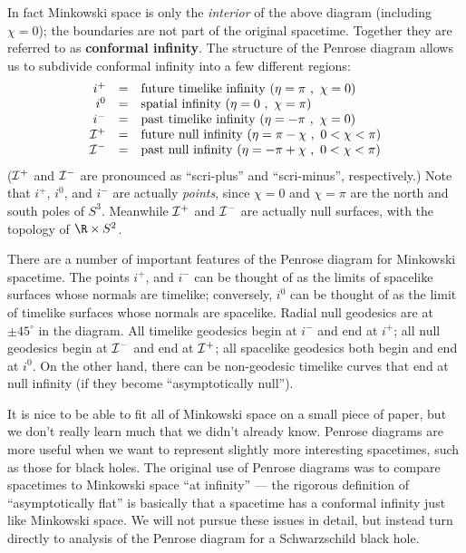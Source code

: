 In fact Minkowski space is only the {\it interior} of the above
diagram (including $\chi=0$); the boundaries are not part of the
original spacetime.  Together they are referred to as {\bf conformal
infinity}.  The structure of the Penrose diagram allows us to subdivide 
conformal infinity into
a few different regions:
\[
  \begin{array}{rcl}
  i^+ &=&  {\rm future~timelike~infinity~} (\eta=\pi\ ,\ \chi=0)\cr
  i^0 &=&  {\rm spatial~infinity~} (\eta=0\ ,\ \chi=\pi)\cr
  i^- &=&  {\rm past~timelike~infinity~} (\eta=-\pi\ ,\ \chi=0)\cr
  {\cal I}^+ &=& {\rm future~null~infinity~} (\eta=\pi-\chi\ ,\ 0<\chi<\pi)\cr
  {\cal I}^- &=& {\rm past~null~infinity~} (\eta=-\pi+\chi\ ,\ 0<\chi<\pi)
  \end{array}
\]
(${\cal I}^+$ and ${\cal I}^-$ are pronounced as ``scri-plus'' and
``scri-minus'', respectively.)  Note that $i^+$, $i^0$, and $i^-$ are
actually {\it points}, since $\chi=0$ and $\chi=\pi$ are the north and
south poles of $S^3$.  Meanwhile ${\cal I}^+$ and ${\cal I}^-$ are
actually null surfaces, with the topology of $\R\times S^2$.

There are a number of important features of the Penrose diagram for
Minkowski spacetime.  The points $i^+$, and $i^-$ can be thought of
as the limits of spacelike surfaces whose normals are timelike;
conversely, $i^0$ can be thought of as the limit of timelike surfaces
whose normals are spacelike.  Radial null geodesics are at 
$\pm 45^\circ$ in the diagram.
All timelike geodesics begin at $i^-$
and end at $i^+$; all null geodesics begin at ${\cal I}^-$ and end
at ${\cal I}^+$; all spacelike geodesics both begin and end at $i^0$.
On the other hand, there can be non-geodesic timelike curves that 
end at null infinity (if they become ``asymptotically null'').

It is nice to be able to fit all of Minkowski space on a small piece
of paper, but we don't really learn much that we didn't already
know.  Penrose diagrams are more useful when we want to represent
slightly more interesting spacetimes, such as those for black holes.
The original use of Penrose diagrams was to compare spacetimes to
Minkowski space ``at infinity'' --- the rigorous definition of
``asymptotically flat'' is basically that a spacetime has a conformal
infinity just like Minkowski space.  We will not pursue these issues
in detail, but instead turn directly to analysis of the Penrose
diagram for a Schwarzschild black hole.


